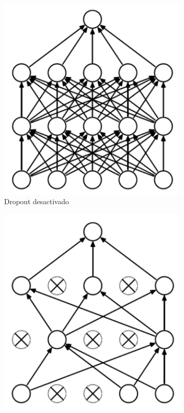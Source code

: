 \begin{itemize}
\begin{figure}[h]
        \begin{subfigure}[b]{0.45\textwidth}
            \centering
            \includegraphics[width=\textwidth]{capitulos/cap_02/imagenes/net_without_dropout.png}
            \caption{Dropout desactivado}
            \label{fig:net_deactivate_dropout}
        \end{subfigure}
        \hfill
        \begin{subfigure}[b]{0.45\textwidth}
            \centering
            \includegraphics[width=\textwidth]{capitulos/cap_02/imagenes/net_with_dropout.png}

\end{subfigure}
\end{figure}
\end{itemize}

